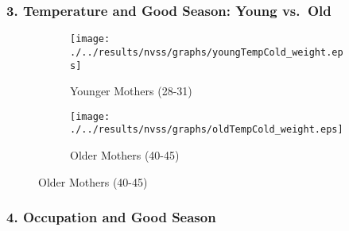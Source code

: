 \documentclass[10pt,letterpaper,subeqn]{beamer}
\begin{document}
%





\begin{frame}[label=weather]
\frametitle{3. Temperature and Good Season: Young vs.\ Old}
\begin{figure}[htpb!]
\begin{center}
\label{fig:tempUSA}
\begin{subfigure}{.5\textwidth}
  \centering
  \texttt{[image: ./../results/nvss/graphs/youngTempCold\_weight.eps]}
  \caption{Younger Mothers (28-31)}
  \label{fig:tempUSAYoung}
\end{subfigure}%
\begin{subfigure}{.5\textwidth}
  \centering
  \texttt{[image: ./../results/nvss/graphs/oldTempCold\_weight.eps]}
  \caption{Older Mothers (40-45)}
  \label{fig:tempUSAOld}
\end{subfigure}
\end{center}
\end{figure}

\vspace{8mm}
\end{frame}


\begin{frame}
\frametitle{4. Occupation and Good Season}

\end{frame}
\end{document}
